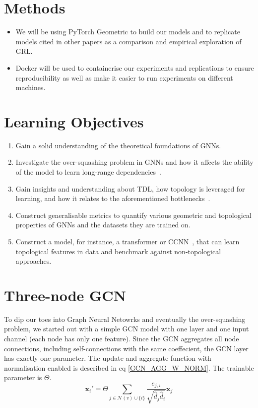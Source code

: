\documentclass[a4paper,12pt]{article}
\begin{document}
\section{Methods}
\begin{itemize}
	\item  We will be using PyTorch Geometric to build our models and to replicate models cited in other papers as a comparison and empirical exploration of GRL.
	\item Docker will be used to containerise our experiments and replications to ensure reproducibility as well as make it easier to run experiments on different machines.
\end{itemize}

\section{Learning Objectives}


\begin{enumerate}
	\item Gain a solid understanding of the theoretical foundations of GNNs.
	\item Investigate the over-squashing problem in GNNs and how it affects the ability of the model to learn long-range dependencies~\cite{alon_bottleneck_2021}.
	\item Gain insights and understanding about TDL, how topology is leveraged for learning, and how it relates to the aforementioned bottlenecks~\cite{horn_topological_2022}.
	\item Construct generalisable metrics to quantify various geometric and topological properties of GNNs and the datasets they are trained on.
	\item Construct a model, for instance, a transformer or CCNN~\cite{tdlbook}, that can learn topological features in data and benchmark against non-topological approaches.
\end{enumerate}


\section{Three-node GCN}

To dip our toes into Graph Neural Netowrks and eventually the over-squashing problem,
we started out with a simple GCN model with one layer and one input channel (each node has only one feature).
Since the GCN aggregates all node connections, including self-connections with the same coeffecient, the GCN layer has exactly one parameter.
The update and aggregate function with normalisation enabled is described in eq \ref{GCN_AGG_W_NORM}. The trainable parameter is \(\Theta\).
\begin{equation}
  \mathbf{x}_i' = \Theta \sum_{j \in \mathcal{N}(v) \cup \{i\}} \frac{e_{j,i}}{\sqrt{\hat{d}_j \hat{d}_i}} \mathbf{x}_j
  \label{GCN_AGG_W_NORM}
\end{equation}
\end{document}
